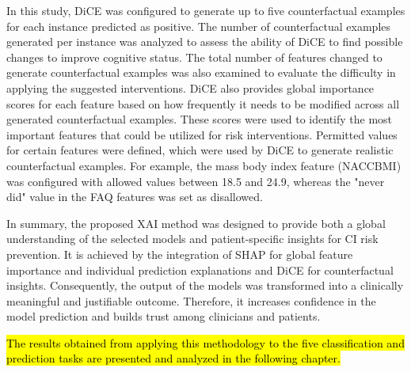 In this study, DiCE was configured to generate up to five counterfactual examples for each instance predicted as positive. The number of counterfactual examples generated per instance was analyzed to assess the ability of DiCE to find possible changes to improve cognitive status. The total number of features changed to generate counterfactual examples was also examined to evaluate the difficulty in applying the suggested interventions. DiCE also provides global importance scores for each feature based on how frequently it needs to be modified across all generated counterfactual examples. These scores were used to identify the most important features that could be utilized for risk interventions. Permitted values for certain features were defined, which were used by DiCE to generate realistic counterfactual examples. For example, the mass body index feature (NACCBMI) was configured with allowed values between 18.5 and 24.9, whereas the "never did" value in the FAQ features was set as disallowed.

In summary, the proposed XAI method was designed to provide both a global understanding of the selected models and patient-specific insights for CI risk prevention. It is achieved by the integration of SHAP for global feature importance and individual prediction explanations and DiCE for counterfactual insights. Consequently, the output of the models was transformed into a clinically meaningful and justifiable outcome. Therefore, it increases confidence in the model prediction and builds trust among clinicians and patients.

\hl{The results obtained from applying this methodology to the five classification and prediction tasks are presented and analyzed in the following chapter.}